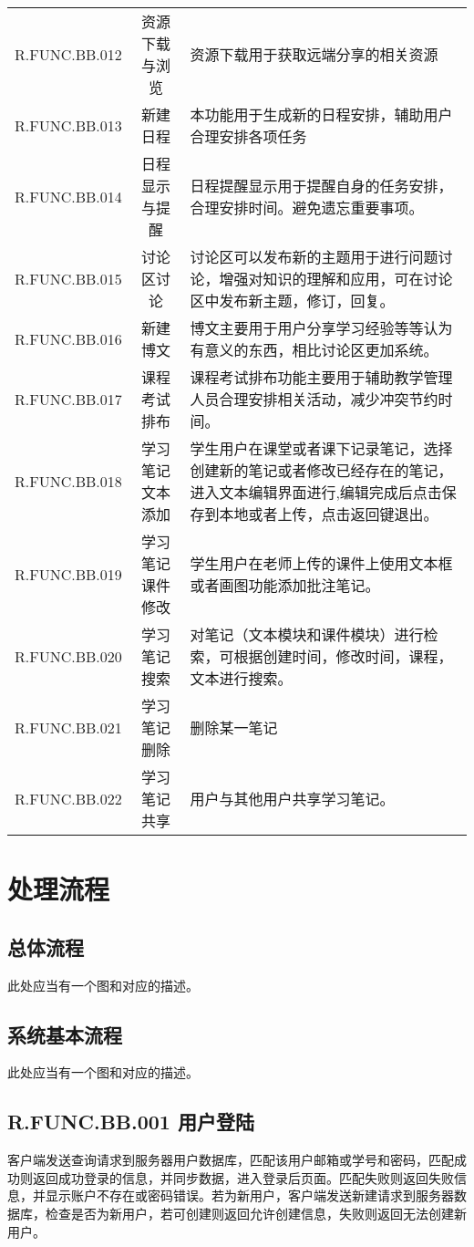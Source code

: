 \begin{longtable}{| c | c | p{7cm} |}
R.FUNC.BB.012   &   资源下载与浏览   &   资源下载用于获取远端分享的相关资源   \\
R.FUNC.BB.013   &   新建日程   &   本功能用于生成新的日程安排，辅助用户合理安排各项任务   \\
R.FUNC.BB.014   &   日程显示与提醒   &   日程提醒显示用于提醒自身的任务安排，合理安排时间。避免遗忘重要事项。   \\
R.FUNC.BB.015   &   讨论区讨论   &   讨论区可以发布新的主题用于进行问题讨论，增强对知识的理解和应用，可在讨论区中发布新主题，修订，回复。   \\
R.FUNC.BB.016   &   新建博文   &   博文主要用于用户分享学习经验等等认为有意义的东西，相比讨论区更加系统。   \\
R.FUNC.BB.017   &   课程考试排布   &   课程考试排布功能主要用于辅助教学管理人员合理安排相关活动，减少冲突节约时间。   \\
R.FUNC.BB.018   &   学习笔记文本添加   &    学生用户在课堂或者课下记录笔记，选择创建新的笔记或者修改已经存在的笔记，进入文本编辑界面进行,编辑完成后点击保存到本地或者上传，点击返回键退出。   \\
R.FUNC.BB.019   &   学习笔记课件修改   &   学生用户在老师上传的课件上使用文本框或者画图功能添加批注笔记。   \\
R.FUNC.BB.020   &   学习笔记搜索   &   对笔记（文本模块和课件模块）进行检索，可根据创建时间，修改时间，课程，文本进行搜索。   \\
R.FUNC.BB.021   &   学习笔记删除   &   删除某一笔记   \\
R.FUNC.BB.022   &   学习笔记共享   &   用户与其他用户共享学习笔记。 \\

\end{longtable}


\section{处理流程}
\subsection{总体流程}
此处应当有一个图和对应的描述。

\subsection{系统基本流程}
此处应当有一个图和对应的描述。

\subsection{R.FUNC.BB.001   用户登陆}
客户端发送查询请求到服务器用户数据库，匹配该用户邮箱或学号和密码，匹配成功则返回成功登录的信息，并同步数据，进入登录后页面。匹配失败则返回失败信息，并显示账户不存在或密码错误。若为新用户，客户端发送新建请求到服务器数据库，检查是否为新用户，若可创建则返回允许创建信息，失败则返回无法创建新用户。

